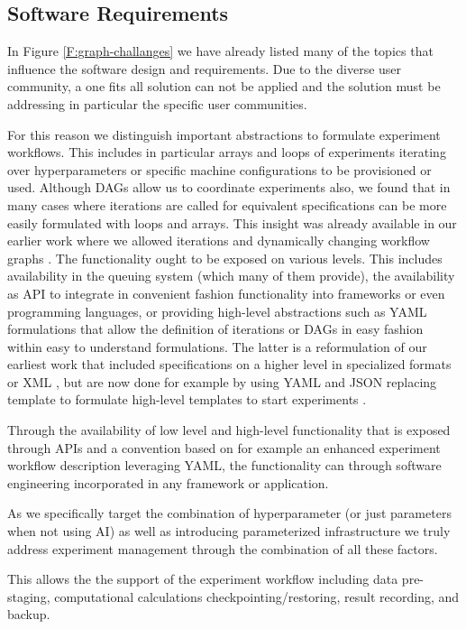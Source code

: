 \documentclass[utf8]{FrontiersinVancouver} %
\begin{document}
\subsection{Software Requirements}
\label{sec:sw-requirements}

In Figure \ref{F:graph-challanges} we have already listed many of the topics that influence the software design and requirements. Due to the diverse user community, a one fits all solution can not be applied and the solution must be addressing in particular the specific user communities.

For this reason we distinguish important abstractions to formulate experiment workflows. This includes in particular arrays and loops of experiments iterating over hyperparameters or specific machine configurations to be provisioned or used. 
Although DAGs allow us to coordinate experiments also, we found that in many cases where iterations are called for equivalent specifications can be more easily formulated with loops and arrays. This insight was already available in our earlier work where we allowed iterations and dynamically changing workflow graphs \citep{las07-workflow}. The functionality ought to be exposed on various levels. This includes availability in the queuing system (which many of them provide), the availability as API to integrate in convenient fashion functionality into frameworks or even programming languages, or providing high-level abstractions such as YAML formulations that allow the definition of iterations or DAGs in easy fashion within easy to understand formulations. The latter is a reformulation of our earliest work that included specifications on a higher level in specialized formats \citep{las-96-ecwmf}  or XML \citep{las07-workflow}, but are now done for example by using YAML and JSON replacing template to formulate high-level templates to start experiments \citep{cloudmesh-cc,cloudmask-ee}.

Through the availability of low level and high-level functionality that is exposed through APIs and a convention based on for example an enhanced experiment workflow description leveraging YAML, the functionality can through software engineering incorporated in any framework or application. 

As we specifically target the combination of hyperparameter (or just parameters when not using AI) as well as introducing parameterized infrastructure we truly address experiment management through the combination of all these factors.

This allows the the support of the experiment workflow including data pre-staging, computational calculations
checkpointing/restoring, result recording, and backup.
\end{document}
